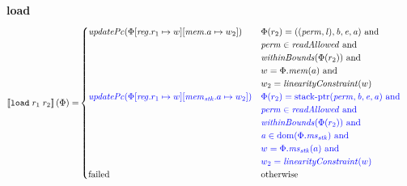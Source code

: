 \documentclass[a4paper]{article}
\newcommand{\sem}[1]{\left\llbracket #1 \right\rrbracket}
\newcommand{\dom}{\mathrm{dom}}
\newcommand{\tand}{\text{ and }}
\newcommand{\totherwise}{\text{otherwise }}
\newcommand{\sourcecolor}[1]{\color{blue}}
\newcommand{\src}[1]{{\sourcecolor{} #1}}
\newcommand{\targetcolor}[1]{\color{black}}
\newcommand{\trg}[1]{{\targetcolor{} #1}}
\newcommand{\zinstr}[1]{\texttt{#1}}
\newcommand{\twoinstr}[3]{
  \ifthenelse{\equal{#2#3}{}}
  {\zinstr{#1}}
  {\zinstr{#1} \; #2 \; #3}
}
\newcommand{\tload}[2]{\twoinstr{\trg{load}}{#1}{#2}}
\newcommand{\update}[2]{[#1 \mapsto #2]}
\newcommand{\updReg}[2]{\update{\reg.#1}{#2}}
\newcommand{\perm}{\var{perm}}
\newcommand{\lin}{\var{l}}
\newcommand{\stkptr}[1]{\mathrm{stack\text{-}ptr}(#1)}
\newcommand{\failed}{\mathrm{failed}}
\newcommand{\var}[1]{\mathit{#1}}
\newcommand{\reg}{\var{reg}}
\newcommand{\mem}{\var{mem}}
\newcommand{\ms}{\var{ms}}
\newcommand{\stk}{\var{stk}}
\newcommand{\baddr}{\var{b}}
\newcommand{\eaddr}{\var{e}}
\newcommand{\aaddr}{\var{a}}
\newcommand{\plainfun}[2]{
  \ifthenelse{\equal{#2}{}}
  {\mathit{#1}}
  {\mathit{#1}(#2)}
}
\newcommand{\updPcAddr}[1]{\plainfun{updatePc}{#1}}
\newcommand{\readAllowed}[1]{\plainfun{readAllowed}{#1}}
\newcommand{\linCons}[1]{\plainfun{linearityConstraint}{#1}}
\newcommand{\withinBounds}[1]{\plainfun{withinBounds}{#1}}
\begin{document}
\noindent\textbf{load}\\
\begin{align*}
  \sem{\tload{r_1}{r_2}}(\Phi) = & 
                                  \begin{cases}
                                    \updPcAddr{\Phi\updReg{r_1}{w}\update{\mem.a}{w_2}} & 
                                    \arraycolsep=0pt
                                    \begin{array}[t]{l}
                                      \Phi(r_2) = ((\perm,\lin),\baddr,\eaddr,\aaddr) \tand \\
                                      \perm \in \readAllowed{} \tand\\
                                      \withinBounds{\Phi(r_2)} \tand \\
                                      w = \Phi.\mem(a) \tand \\
                                      w_2 = \linCons{w}
                                    \end{array}
                                    \\
                                    \src{\updPcAddr{\Phi\updReg{r_1}{w}\update{\mem_\stk.a}{w_2}}} & 
                                    \arraycolsep=0pt
                                    \begin{array}[t]{l}
                                      \src{\Phi(r_2) = \stkptr{\perm,\baddr,\eaddr,\aaddr} \tand} \\
                                      \src{\perm \in \readAllowed{} \tand} \\
                                      \src{\withinBounds{\Phi(r_2)} \tand} \\
                                      \src{\aaddr \in \dom(\Phi.\ms_\stk) \tand} \\
                                      \src{w = \Phi.\ms_\stk(a) \tand} \\
                                      \src{w_2 = \linCons{w}}
                                    \end{array}
                                    \\
                                    \failed & \totherwise                                    
                                  \end{cases}
\end{align*} 
\end{document}
